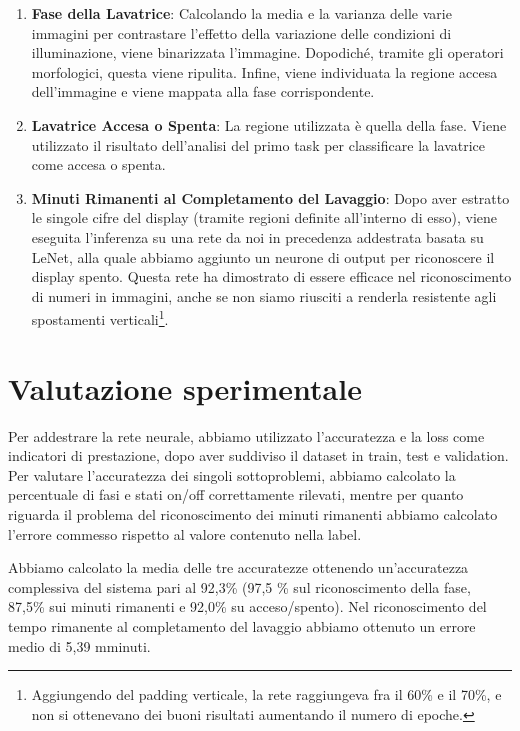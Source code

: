 \documentclass{article}
\begin{document}
\begin{enumerate}
\item
  \textbf{Fase della Lavatrice}: Calcolando la media e la
  varianza delle varie immagini per contrastare l'effetto della
  variazione delle condizioni di illuminazione, viene binarizzata
  l'immagine. Dopodiché, tramite gli operatori morfologici, questa viene
  ripulita. Infine, viene individuata la regione accesa dell'immagine e
  viene mappata alla fase corrispondente.
\item
  \textbf{Lavatrice Accesa o Spenta}: La regione utilizzata è
  quella della fase. Viene utilizzato il risultato dell'analisi del
  primo task per classificare la lavatrice come accesa o spenta.
\item
  \textbf{Minuti Rimanenti al Completamento del Lavaggio}: Dopo
  aver estratto le singole cifre del display (tramite regioni definite
  all'interno di esso), viene eseguita l'inferenza su una rete da noi in
  precedenza addestrata basata su LeNet, alla quale abbiamo aggiunto un
  neurone di output per riconoscere il display spento. Questa rete ha
  dimostrato di essere efficace nel riconoscimento di numeri in
  immagini, anche se non siamo riusciti a renderla resistente agli
  spostamenti verticali\footnote{Aggiungendo del padding verticale,
  la rete raggiungeva fra il 60\% e il 70\%, e non si ottenevano dei
  buoni risultati aumentando il numero di epoche.}.
\end{enumerate}

\section{Valutazione sperimentale}\label{valutazione-sperimentale}

\par Per addestrare la rete neurale, abbiamo utilizzato l'accuratezza e la
loss come indicatori di prestazione, dopo aver suddiviso il dataset in
train, test e validation. Per valutare l'accuratezza dei singoli
sottoproblemi, abbiamo calcolato la percentuale di fasi e stati on/off
correttamente rilevati, mentre per quanto riguarda il problema del
riconoscimento dei minuti rimanenti abbiamo calcolato l'errore commesso
rispetto al valore contenuto nella label.

\par Abbiamo calcolato la media delle tre accuratezze ottenendo
un'accuratezza complessiva del sistema pari al 92,3\% (97,5
\% sul riconoscimento della fase, 87,5\% sui minuti rimanenti e 92,0\% su acceso/spento).  Nel riconoscimento del tempo rimanente al completamento del lavaggio abbiamo ottenuto un errore medio di 5,39 mminuti.
\end{document}
